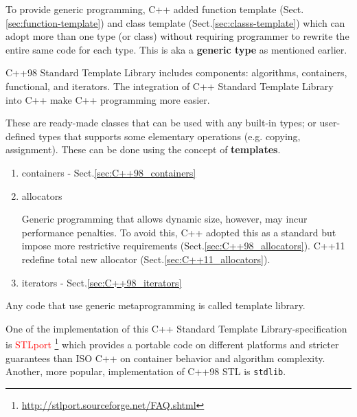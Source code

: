 To provide generic programming, C++ added function template
(Sect.\ref{sec:function-template}) and class template
(Sect.\ref{sec:classs-template}) which can adopt more than one type (or class)
without requiring programmer to rewrite the entire same code for each type.
This is aka a {\bf generic type} as mentioned earlier. 

C++98 Standard Template Library includes components:
algorithms, containers, functional, and iterators.  The integration of C++
Standard Template Library  into C++ make C++ programming more easier.

These are ready-made classes that can be used with any built-in types; or
user-defined types that supports some elementary operations (e.g.
copying, assignment). These can be done using the concept of {\bf templates}.
\begin{enumerate}
  \item containers - Sect.\ref{sec:C++98_containers}
  
  \item allocators

Generic programming that allows dynamic size, however, may incur performance
penalties. To avoid this, C++ adopted this as a standard but impose more
restrictive requirements (Sect.\ref{sec:C++98_allocators}). C++11 redefine total
new allocator (Sect.\ref{sec:C++11_allocators}).
  
  \item iterators - Sect.\ref{sec:C++98_iterators}
\end{enumerate}

Any code that use generic metaprogramming is called template library. 

One of the implementation of this C++ Standard Template Library-specification is
\textcolor{red}{STLport}
\footnote{\url{http://stlport.sourceforge.net/FAQ.shtml}} which provides a
portable code on different platforms and stricter guarantees than ISO C++ on
container behavior and algorithm complexity. Another, more popular,
implementation of C++98 STL is \verb!stdlib!. 




